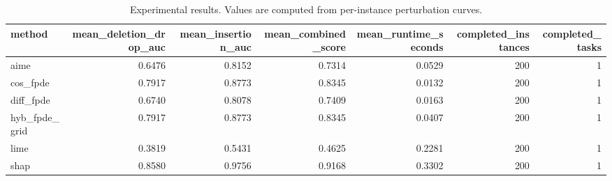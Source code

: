 \begin{table}[t]
\caption{Experimental results. Values are computed from per-instance perturbation curves.}
\label{tab:main_results_computed}
\centering
\begin{tabular}{lrrrrrr}
\toprule
method & mean\_deletion\_drop\_auc & mean\_insertion\_auc & mean\_combined\_score & mean\_runtime\_seconds & completed\_instances & completed\_tasks \\
\midrule
aime & 0.6476 & 0.8152 & 0.7314 & 0.0529 & 200 & 1 \\
cos\_fpde & 0.7917 & 0.8773 & 0.8345 & 0.0132 & 200 & 1 \\
diff\_fpde & 0.6740 & 0.8078 & 0.7409 & 0.0163 & 200 & 1 \\
hyb\_fpde\_grid & 0.7917 & 0.8773 & 0.8345 & 0.0407 & 200 & 1 \\
lime & 0.3819 & 0.5431 & 0.4625 & 0.2281 & 200 & 1 \\
shap & 0.8580 & 0.9756 & 0.9168 & 0.3302 & 200 & 1 \\
\bottomrule
\end{tabular}

\end{table}
